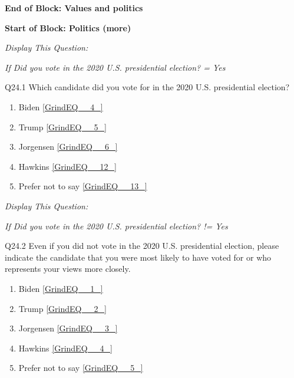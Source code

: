 \documentclass{article} %
\begin{document}
\noindent 

\noindent \textbf{End of Block: Values and politics}

\noindent \textbf{}

\noindent \textbf{Start of Block: Politics (more)}

\noindent \textit{Display This Question:}

\textit{If Did you vote in the 2020 U.S. presidential election? = Yes}

\noindent 

\noindent Q24.1 Which candidate did you vote for in the 2020 U.S. presidential election?

\begin{enumerate}
\item  Biden  \eqref{GrindEQ__4_} 

\item  Trump  \eqref{GrindEQ__5_} 

\item  Jorgensen  \eqref{GrindEQ__6_} 

\item  Hawkins  \eqref{GrindEQ__12_} 

\item  Prefer not to say  \eqref{GrindEQ__13_} 
\end{enumerate}

\noindent 

\noindent 

\noindent \textit{Display This Question:}

\textit{If Did you vote in the 2020 U.S. presidential election? != Yes}

\noindent 

\noindent Q24.2 Even if you did not vote in the 2020 U.S. presidential election, please indicate the candidate that you were most likely to have voted for or who represents your views more closely.

\begin{enumerate}
\item  Biden  \eqref{GrindEQ__1_} 

\item  Trump  \eqref{GrindEQ__2_} 

\item  Jorgensen  \eqref{GrindEQ__3_} 

\item  Hawkins  \eqref{GrindEQ__4_} 

\item  Prefer not to say  \eqref{GrindEQ__5_} 
\end{enumerate}
\end{document}
